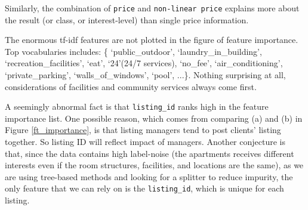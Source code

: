 \documentclass{article}
\begin{document}
Similarly, the combination of \texttt{price} and \texttt{non-linear price} explains more about the result (or class, or interest-level) than single price information. 

The enormous tf-idf features are not plotted in the figure of feature importance. Top vocabularies includes: \{ `public\_outdoor', `laundry\_in\_building', `recreation\_facilities',  `eat', `24'(24/7 services), `no\_fee', `air\_conditioning', `private\_parking', `walls\_of\_windows', `pool', ...\}. Nothing surprising at all, considerations of facilities and community services always come first.

A seemingly abnormal fact is that \texttt{listing\_id} ranks high in the feature importance list. One possible reason, which comes from comparing (a) and (b) in Figure \ref{ft_importance}, is that listing managers tend to post clients' listing together. So listing ID will reflect impact of managers. Another conjecture is that, since the data contains high label-noise (the apartments receives different interests even if the room structures, facilities, and locations are the same), as we are using tree-based methods and looking for a splitter to reduce impurity, the only feature that we can rely on is the \texttt{listing\_id}, which is unique for each listing. 
\end{document}
